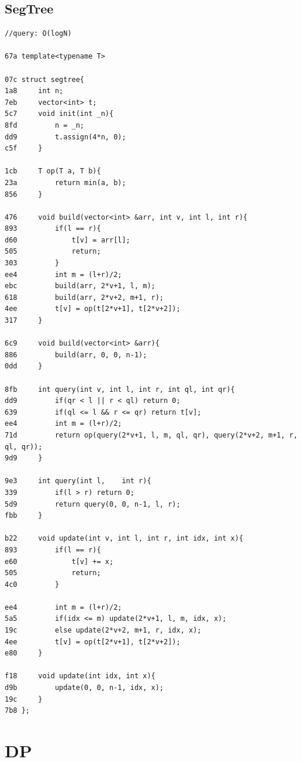 \documentclass[11pt, a4paper, twoside]{article}
\begin{document}
\subsection{SegTree}
\begin{lstlisting}
//query: O(logN)

67a template<typename T>

07c struct segtree{
1a8     int n;
7eb     vector<int> t;
5c7     void init(int _n){
8fd         n = _n;
dd9         t.assign(4*n, 0);
c5f     }
    
1cb     T op(T a, T b){
23a         return min(a, b);
856     }
    
476     void build(vector<int> &arr, int v, int l, int r){
893         if(l == r){
d60             t[v] = arr[l];
505             return;
303         }
ee4         int m = (l+r)/2;
ebc         build(arr, 2*v+1, l, m);
618         build(arr, 2*v+2, m+1, r);
4ee         t[v] = op(t[2*v+1], t[2*v+2]);
317     }
    
6c9     void build(vector<int> &arr){
886         build(arr, 0, 0, n-1);
0dd     }
    
8fb     int query(int v, int l, int r, int ql, int qr){
dd9         if(qr < l || r < ql) return 0;
639         if(ql <= l && r <= qr) return t[v];
ee4         int m = (l+r)/2;
71d         return op(query(2*v+1, l, m, ql, qr), query(2*v+2, m+1, r, ql, qr));
9d9     }
    
9e3     int query(int l,    int r){
339         if(l > r) return 0;
5d9         return query(0, 0, n-1, l, r);
fbb     }
    
b22     void update(int v, int l, int r, int idx, int x){
893         if(l == r){
e60             t[v] += x;
505             return;
4c0         }
    
ee4         int m = (l+r)/2;
5a5         if(idx <= m) update(2*v+1, l, m, idx, x);
19c         else update(2*v+2, m+1, r, idx, x);
4ee         t[v] = op(t[2*v+1], t[2*v+2]);
e80     }
    
f18     void update(int idx, int x){
d9b         update(0, 0, n-1, idx, x);
19c     }
7b8 };
\end{lstlisting}



%
%

\section{DP}
\end{document}
